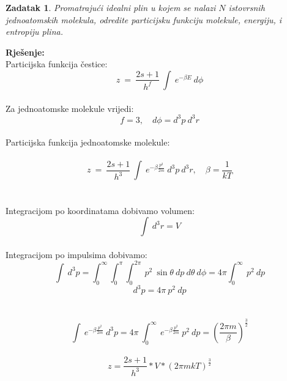 \documentclass[a4paper,12pt]{article}
\newtheorem{ZDK}{Zadatak}[section]
\begin{document}
\newpage
\begin{ZDK}
	Promatraju\'ci idealni plin u kojem se nalazi $N$ istovrsnih jednoatomskih molekula, odredite \textit{particijsku funkciju} molekule, 
	\textit{energiju}, i \textit{entropiju} plina.
\end{ZDK}
\textbf{Rje\v{s}enje:} \\
\newline
Particijska funkcija \v{c}estice:
\\
$$ z\ =\ \frac{2s+1}{h^f}\ \int\ e^{-\beta E}\ d\phi $$
\\
Za jednoatomske molekule vrijedi:
$$ f=3, \quad d\phi=d^3p\ d^3r $$
\\
Particijska funkcija jednoatomske molekule:
\\
\\
$$ z\ =\ \frac{2s+1}{h^3}\ \int\ e^{-\beta\frac{p^2}{2m}}\ d^3p\ d^3r, \quad \beta=\frac{1}{kT} $$
\\
\\
Integracijom po koordinatama dobivamo volumen:
\\
$$ \int\ d^3r=V $$
\\
Integracijom po impulsima dobivamo:
\\
$$ \int\ d^3p=\int_{0}^{\infty}\int_{0}^{\pi}\int_{0}^{2\pi}\ p^2\ \sin{\theta}\ dp\ d\theta\ d\phi = 4\pi \int_{0}^{\infty}\ p^2\ dp $$
$$ d^3p=4\pi\ p^2\ dp $$
\\
\\
$$ \int\ e^{-\beta\frac{p^2}{2m}}\ d^3p = 4\pi\ \int_{0}^{\infty}\ e^{-\beta\frac{p^2}{2m}}\ p^2\ dp = \left( \frac{2\pi m}{\beta} \right)^{\frac{3}{2}} $$
\\
$$ z=\frac{2s+1}{h^3}*V*\left( 2\pi mkT \right)^{\frac{3}{2}} $$
\end{document}
